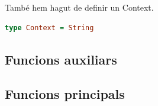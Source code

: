 \documentclass[10pt,a4paper]{article}
\begin{document}
També hem hagut de definir un Context.

\begin{lstlisting}[language=Haskell]
type Context = String
\end{lstlisting}

\clearpage

\subsection{Funcions auxiliars}

\clearpage

\subsection{Funcions principals}
\end{document}
